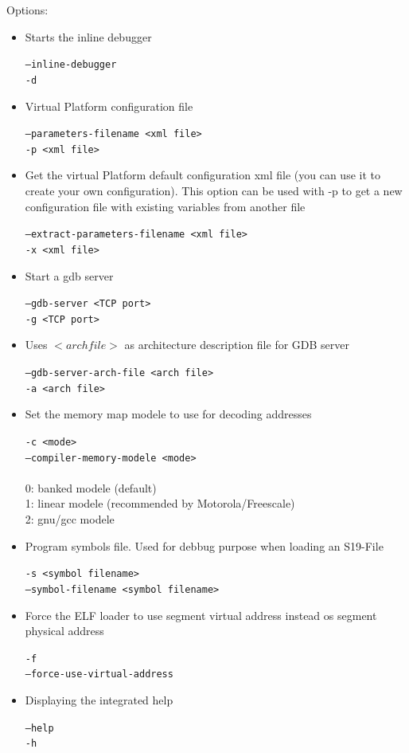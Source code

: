 Options:
\begin{itemize}

\item Starts the inline debugger

\texttt{--inline-debugger}
\\
\texttt{-d}

\item Virtual Platform configuration file

\texttt{--parameters-filename <xml file>}
\\
\texttt{-p <xml file>}

\item Get the virtual Platform default configuration xml file (you can use it to create your own configuration). This option can be used with -p to get a new configuration file with existing variables from another file

\texttt{--extract-parameters-filename <xml file>}
\\
\texttt{-x <xml file>}

\item Start a gdb server

\texttt{--gdb-server <TCP port>}
\\
\texttt{-g <TCP port>}

\item Uses $<arch file>$ as architecture description file for GDB server

\texttt{--gdb-server-arch-file <arch file>}
\\
\texttt{-a  <arch file>}

\item Set the memory map modele to use for decoding addresses

\texttt{-c <mode>}
\\
\texttt{--compiler-memory-modele <mode>}
\\
\\
            0: banked modele (default)\\
            1: linear modele (recommended by Motorola/Freescale)\\
            2: gnu/gcc modele\\

\item Program symbols file. Used for debbug purpose when loading an S19-File

\texttt{-s <symbol filename>}
\\
\texttt{--symbol-filename <symbol filename>}

\item Force the ELF loader to use segment virtual address instead os segment physical address

\texttt{-f}
\\
\texttt{--force-use-virtual-address}

\item Displaying the integrated help

\texttt{--help}
\\
\texttt{-h}

\end{itemize}


